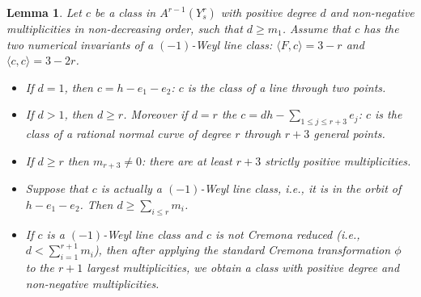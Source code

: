 \documentclass[12pt]{article}
\numberwithin{equation}{section}
\newtheorem{lemma}[equation]{Lemma}
\numberwithin{equation}{section}
\numberwithin{subeq}{equation}
\begin{document}
\begin{lemma}\label{numericallemma}
Let $c$ be a class in $A^{r-1}(Y^r_s)$ with positive degree $d$ and non-negative multiplicities in non-decreasing order, such that $d \geq m_1$.
Assume that $c$ has the two numerical invariants of a $(-1)$-Weyl line class:
$\langle F,c\rangle = 3-r$ and $\langle c,c\rangle = 3-2r$.
\begin{itemize}
\item[(a)] If $d=1$, then $c = h-e_1-e_2$:
$c$ is the class of a line through two points.
\item[(b)] If $d > 1$, then $d \geq r$.
Moreover if $d = r$ the $c = dh-\sum_{1\leq j\leq r+3} e_j$:
$c$ is the class of a rational normal curve of degree $r$ through $r+3$ general points.
\item[(c)] If $d \geq r$
then $m_{r+3}\neq 0$:
there are at least $r+3$ strictly positive multiplicities.
\item[(d)] Suppose that $c$ is actually a $(-1)$-Weyl line class,
i.e., it is in the orbit of $h-e_1-e_2$.
Then $d \geq \sum_{i\leq r} m_i$.
\item[(e)] If $c$ is a $(-1)$-Weyl line class
and $c$ is not Cremona reduced (i.e., $d < \sum_{i=1}^{r+1} m_i$),
then after applying the standard Cremona transformation $\phi$ 
to the $r+1$ largest multiplicities, 
we obtain a class with positive degree and non-negative multiplicities.
\end{itemize}
\end{lemma}
\end{document}
